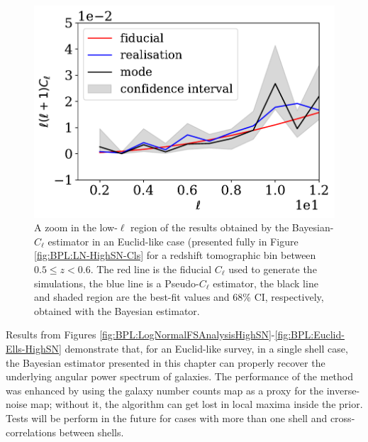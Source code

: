\begin{figure}
\begin{center}
\includegraphics[scale=0.60]{BPL-FIGS/Euclid-LN-PNoi-N32-HDens_HPDCls-lowEll.pdf}
\caption[A zoom in the low-$\ell$ region of the results obtained by the Bayesian-$C_{\ell}$ estimator in an Euclid-like case for a redshift tomographic bin between $0.5 \leq z < 0.6$.]{A zoom in the low-$\ell$ region of the results obtained by the Bayesian-$C_{\ell}$ estimator in an Euclid-like case (presented fully in Figure \ref{fig:BPL:LN-HighSN-Cls} for a redshift tomographic bin between $0.5 \leq z < 0.6$. The red line is the fiducial $C_{\ell}$ used to generate the simulations, the blue line is a Pseudo-$C_{\ell}$ estimator, the black line and shaded region are the best-fit values and 68\% CI, respectively, obtained with the Bayesian estimator.}
\label{fig:BPL:LN-HighSN-LowEll}
\end{center}
\end{figure}

\qquad Results from Figures \ref{fig:BPL:LogNormalFSAnalysisHighSN}-\ref{fig:BPL:Euclid-Ells-HighSN} demonstrate that, for an Euclid-like survey, in a single shell case, the Bayesian estimator presented in this chapter can properly recover the underlying angular power spectrum of galaxies. The performance of the method was enhanced by using the galaxy number counts map as a proxy for the inverse-noise map; without it, the algorithm can get lost in local maxima inside the prior. Tests will be perform in the future for cases with more than one shell and cross-correlations between shells.

